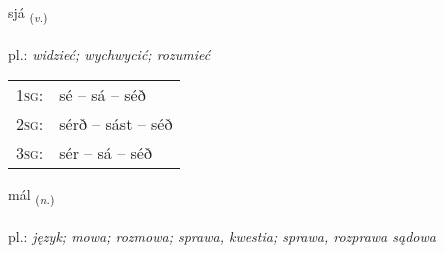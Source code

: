 \documentclass[frontgrid, backgrid]{flacards}\usepackage[]{graphicx}\usepackage[]{xcolor}
\begin{document}
{sjá \small{\textsubscript{(\textit{v.})}} \\[1ex] %
\textphonetic{[sjauː]} \\
pl.: \emph{widzieć; wychwycić; rozumieć} \\  [2ex]
\renewcommand*{\arraystretch}{0.8}
\begin{tabular}{p{1cm}l}
\textsc{1sg}: & sé -- sá -- séð \\ 
\textsc{2sg}: & sérð -- sást -- séð \\ 
\textsc{3sg}: & sér -- sá -- séð \\ 
\end{tabular}
}

\renewcommand{\flhead}{\vskip5pt \fboxsep=0pt {\small\bfseries\footnotesize Nafnorð | Noun}}
\renewcommand{\fcfoot}{\vskip5pt \fboxsep=0pt \hspace{2pt}{\small\bfseries\footnotesize 1K}}

\renewcommand{\blhead}{\vskip5pt {\small\bfseries\footnotesize Nafnorð | Noun }}
\renewcommand{\bcfoot}{\vskip5pt \hspace{2pt}{\small\bfseries\footnotesize 1K}}


{mál \small{\textsubscript{(\textit{n.})}} \\[1ex] %
\textphonetic{[mauːl]} \\
pl.: \emph{język; mowa; rozmowa; sprawa, kwestia; sprawa, rozprawa sądowa} \\  [2ex]
\renewcommand*{\arraystretch}{0.8}
}

\renewcommand{\flhead}{\vskip5pt \fboxsep=0pt {\small\bfseries\footnotesize Atviksorð | Adverb}}
\renewcommand{\fcfoot}{\vskip5pt \fboxsep=0pt \hspace{2pt}{\small\bfseries\footnotesize 1K}}
\end{document}
